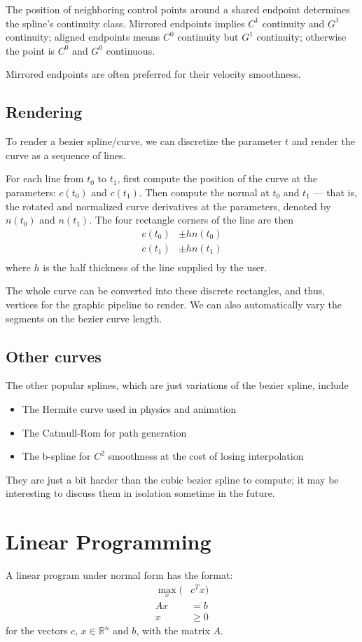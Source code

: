 \documentclass[11pt]{article}
\begin{document}
The position of neighboring control points around a shared endpoint determines the spline's continuity class. Mirrored endpoints implies $C^1$ continuity and $G^1$ continuity; aligned endpoints means $C^0$ continuity but $G^1$ continuity; otherwise the point is $C^0$ and $G^0$ continuous.

Mirrored endpoints are often preferred for their velocity smoothness.

\subsection{Rendering}
To render a bezier spline/curve, we can discretize the parameter $t$ and render the curve as a sequence of lines.

For each line from $t_0$ to $t_1$, first compute the position of the curve at the parameters: $c(t_0)$ and $c(t_1)$. Then compute the normal at $t_0$ and $t_1$ --- that is, the rotated and normalized curve derivatives at the parameters, denoted by $n(t_0)$ and $n(t_1)$. The four rectangle corners of the line are then
\begin{align*}
	 c(t_0) &\pm h n(t_0)\\
	 c(t_1) &\pm h n(t_1)\\
\end{align*}
where $h$ is the half thickness of the line supplied by the user.

The whole curve can be converted into these discrete rectangles, and thus, vertices for the graphic pipeline to render. We can also automatically vary the segments on the bezier curve length.

\subsection{Other curves}
The other popular splines, which are just variations of the bezier spline, include
\begin{itemize}
	\item The Hermite curve used in physics and animation
	\item The Catmull-Rom for path generation
	\item The b-spline for $C^2$ smoothness at the cost of losing interpolation
\end{itemize}
They are just a bit harder than the cubic bezier spline to compute; it may be interesting to discuss them in isolation sometime in the future.


\newpage
\section{Linear Programming}
A linear program under normal form has the format:
\begin{align*}
	\max_{x}(&c^T x)\\
	Ax &= b\\
	x &\geq 0
\end{align*}
for the vectors $c$, $x \in \mathbb{R}^n$ and $b$, with the matrix $A$.
\end{document}
